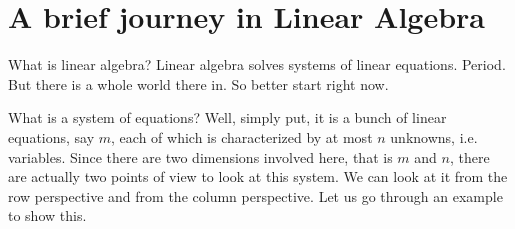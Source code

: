 \documentclass[computationalMathematics.tex]{subfiles}
\begin{document}
\section{A brief journey in Linear Algebra}
\label{section:MAT08/1-introduction}
\par What is linear algebra? Linear algebra solves systems of linear equations. Period. But there is a whole world there in. So better start right now.
\par What is a system of equations? Well, simply put, it is a bunch of linear equations, say $m$, each of which is characterized by at most $n$ unknowns, i.e. variables. Since there are two dimensions involved here, that is $m$ and $n$, there are actually two points of view to look at this system. We can look at it from the row perspective and from the column perspective. Let us go through an example to show this.
\end{document}
